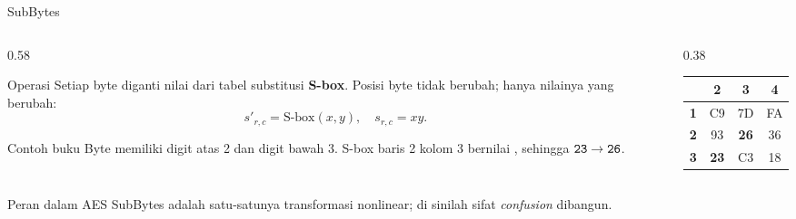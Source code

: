 \documentclass[aspectratio=169,11pt]{beamer}
\begin{document}
\begin{frame}{SubBytes}
    \footnotesize
    \begin{columns}[T,onlytextwidth]
        \begin{column}{0.58\textwidth}
            \begin{block}{Operasi}
                Setiap byte diganti nilai dari tabel substitusi
                \textbf{S-box}. Posisi byte tidak berubah; hanya nilainya
                yang berubah:
                \[
                    s'_{r,c} = \text{S-box}(x,y), \quad s_{r,c} = xy.
                \]
            \end{block}
            \begin{exampleblock}{Contoh buku}
                Byte  memiliki digit atas 2 dan digit bawah 3.
                S-box baris 2 kolom 3 bernilai , sehingga
                $\texttt{23} \to \texttt{26}$.
            \end{exampleblock}
        \end{column}
        \begin{column}{0.38\textwidth}
            \centering
            \scriptsize
            \begin{tabular}{@{}c ccc@{}}
                \toprule
                & \textbf{2} & \textbf{3} & \textbf{4} \\
                \midrule
                \textbf{1} & C9 & 7D & FA \\
                \textbf{2} & 93 & \textbf{26} & 36 \\
                \textbf{3} & \textbf{23} & C3 & 18 \\
                \bottomrule
            \end{tabular}
        \end{column}
    \end{columns}
    \vspace{0.1cm}
    \begin{alertblock}{Peran dalam AES}
        \footnotesize
        SubBytes adalah satu-satunya transformasi nonlinear; di sinilah
        sifat \textit{confusion} dibangun.
    \end{alertblock}
\end{frame}
\end{document}
